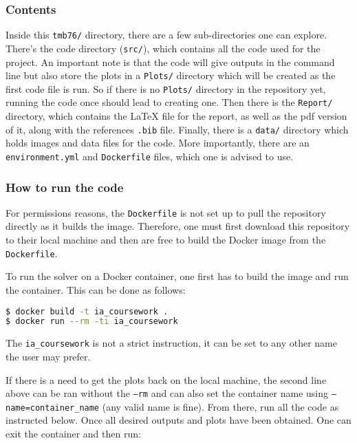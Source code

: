 \documentclass[12pt]{report} %
\begin{document}
\subsubsection{Contents}

Inside this \texttt{tmb76/} directory, there are a few sub-directories one can explore. There's the code directory (\texttt{src/}), which contains all the code used for the project. An important note is that the code will give outputs in the command line but also store the plots in a \texttt{Plots/} directory which will be created as the first code file is run. So if there is no \texttt{Plots/} directory in the repository yet, running the code once should lead to creating one. Then there is the \texttt{Report/} directory, which contains the LaTeX file for the report, as well as the pdf version of it, along with the references \texttt{.bib} file. Finally, there is a \texttt{data/} directory which holds images and data files for the code.
More importantly, there are an \texttt{environment.yml} and \texttt{Dockerfile} files, which one is advised to use.

\subsubsection{How to run the code}
For permissions reasons, the \texttt{Dockerfile} is not set up to pull the repository directly as it builds the image. Therefore, one must first download this repository to their local machine and then are free to build the Docker image from the \texttt{Dockerfile}.

To run the solver on a Docker container, one first has to build the image and run the container. This can be done as follows:

\begin{lstlisting}[language=bash]
$ docker build -t ia_coursework .
$ docker run --rm -ti ia_coursework
\end{lstlisting}

The \texttt{ia\_coursework} is not a strict instruction, it can be set to any other name the user may prefer.

If there is a need to get the plots back on the local machine, the second line above can be ran without the \texttt{--rm} and can also set the container name using \texttt{--name=container\_name} (any valid name is fine). From there, run all the code as instructed below. Once all desired outputs and plots have been obtained. One can exit the container and then run:
\end{document}
